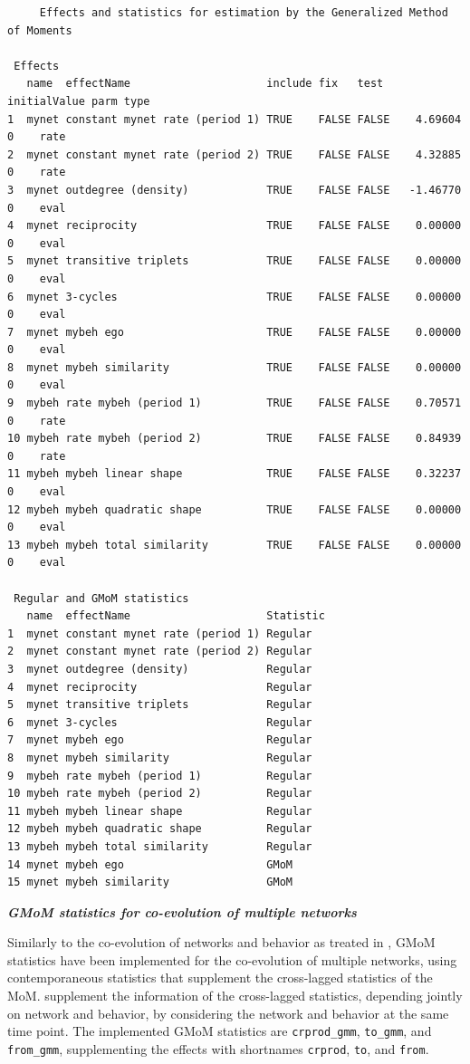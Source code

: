\documentclass[a4paper,fleqn,11pt]{article}
\newcommand{\+}{\, + \,}
\begin{document}
{\footnotesize
\begin{verbatim}
	 Effects and statistics for estimation by the Generalized Method of Moments

 Effects
   name  effectName                     include fix   test  initialValue parm type
1  mynet constant mynet rate (period 1) TRUE    FALSE FALSE    4.69604   0    rate
2  mynet constant mynet rate (period 2) TRUE    FALSE FALSE    4.32885   0    rate
3  mynet outdegree (density)            TRUE    FALSE FALSE   -1.46770   0    eval
4  mynet reciprocity                    TRUE    FALSE FALSE    0.00000   0    eval
5  mynet transitive triplets            TRUE    FALSE FALSE    0.00000   0    eval
6  mynet 3-cycles                       TRUE    FALSE FALSE    0.00000   0    eval
7  mynet mybeh ego                      TRUE    FALSE FALSE    0.00000   0    eval
8  mynet mybeh similarity               TRUE    FALSE FALSE    0.00000   0    eval
9  mybeh rate mybeh (period 1)          TRUE    FALSE FALSE    0.70571   0    rate
10 mybeh rate mybeh (period 2)          TRUE    FALSE FALSE    0.84939   0    rate
11 mybeh mybeh linear shape             TRUE    FALSE FALSE    0.32237   0    eval
12 mybeh mybeh quadratic shape          TRUE    FALSE FALSE    0.00000   0    eval
13 mybeh mybeh total similarity         TRUE    FALSE FALSE    0.00000   0    eval

 Regular and GMoM statistics
   name  effectName                     Statistic
1  mynet constant mynet rate (period 1) Regular
2  mynet constant mynet rate (period 2) Regular
3  mynet outdegree (density)            Regular
4  mynet reciprocity                    Regular
5  mynet transitive triplets            Regular
6  mynet 3-cycles                       Regular
7  mynet mybeh ego                      Regular
8  mynet mybeh similarity               Regular
9  mybeh rate mybeh (period 1)          Regular
10 mybeh rate mybeh (period 2)          Regular
11 mybeh mybeh linear shape             Regular
12 mybeh mybeh quadratic shape          Regular
13 mybeh mybeh total similarity         Regular
14 mynet mybeh ego                      GMoM
15 mynet mybeh similarity               GMoM
\end{verbatim}}
\normalsize
\bigskip


\noindent
\textbf{\emph{GMoM statistics for co-evolution of multiple networks }}
\medskip

Similarly to the co-evolution of networks and behavior as treated in
\citep{ASS2019}, GMoM statistics have been implemented
for the co-evolution of multiple networks, using contemporaneous
statistics that supplement the cross-lagged statistics of the MoM.
supplement the information of the cross-lagged statistics, depending jointly
on network and behavior, by considering the network and behavior at the same time point.
The implemented GMoM statistics are \texttt{crprod\_gmm}, \texttt{to\_gmm},
and \texttt{from\_gmm}, supplementing the effects with shortnames
\texttt{crprod}, \texttt{to}, and \texttt{from}.
\bigskip
\end{document}
